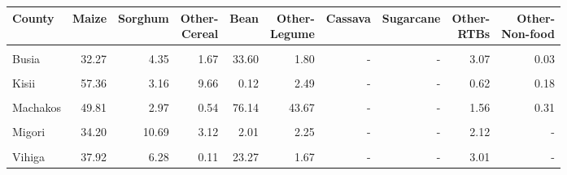 \begin{table}[!h]
\centering
\begin{tabular}{lrrrrrrrrr}
\toprule
County & Maize & Sorghum & \makecell{Other-\\Cereal} & Bean & \makecell{Other-\\Legume} & Cassava & Sugarcane & \makecell{Other-\\RTBs} & \makecell{Other-\\Non-food}\\
\midrule
\cellcolor{gray!10}{Bungoma} & \cellcolor{gray!10}{42.71} & \cellcolor{gray!10}{5.55} & \cellcolor{gray!10}{1.12} & \cellcolor{gray!10}{65.36} & \cellcolor{gray!10}{1.90} & \cellcolor{gray!10}{-} & \cellcolor{gray!10}{-} & \cellcolor{gray!10}{4.27} & \cellcolor{gray!10}{-}\\
Busia & 32.27 & 4.35 & 1.67 & 33.60 & 1.80 & - & - & 3.07 & 0.03\\
\cellcolor{gray!10}{Kakamega} & \cellcolor{gray!10}{81.26} & \cellcolor{gray!10}{10.17} & \cellcolor{gray!10}{1.62} & \cellcolor{gray!10}{62.05} & \cellcolor{gray!10}{3.01} & \cellcolor{gray!10}{0.06} & \cellcolor{gray!10}{0.18} & \cellcolor{gray!10}{7.30} & \cellcolor{gray!10}{0.14}\\
Kisii & 57.36 & 3.16 & 9.66 & 0.12 & 2.49 & - & - & 0.62 & 0.18\\
\cellcolor{gray!10}{Kitui} & \cellcolor{gray!10}{1.00} & \cellcolor{gray!10}{0.20} & \cellcolor{gray!10}{0.07} & \cellcolor{gray!10}{39.62} & \cellcolor{gray!10}{24.58} & \cellcolor{gray!10}{-} & \cellcolor{gray!10}{-} & \cellcolor{gray!10}{0.00} & \cellcolor{gray!10}{-}\\
\addlinespace
Machakos & 49.81 & 2.97 & 0.54 & 76.14 & 43.67 & - & - & 1.56 & 0.31\\
\cellcolor{gray!10}{Makueni} & \cellcolor{gray!10}{19.01} & \cellcolor{gray!10}{1.41} & \cellcolor{gray!10}{0.21} & \cellcolor{gray!10}{43.27} & \cellcolor{gray!10}{30.51} & \cellcolor{gray!10}{-} & \cellcolor{gray!10}{-} & \cellcolor{gray!10}{0.26} & \cellcolor{gray!10}{-}\\
Migori & 34.20 & 10.69 & 3.12 & 2.01 & 2.25 & - & - & 2.12 & -\\
\cellcolor{gray!10}{Nyamira} & \cellcolor{gray!10}{45.56} & \cellcolor{gray!10}{1.09} & \cellcolor{gray!10}{3.37} & \cellcolor{gray!10}{0.19} & \cellcolor{gray!10}{1.15} & \cellcolor{gray!10}{-} & \cellcolor{gray!10}{-} & \cellcolor{gray!10}{0.39} & \cellcolor{gray!10}{0.01}\\
Vihiga & 37.92 & 6.28 & 0.11 & 23.27 & 1.67 & - & - & 3.01 & -\\
\bottomrule
\end{tabular}
\end{table}
